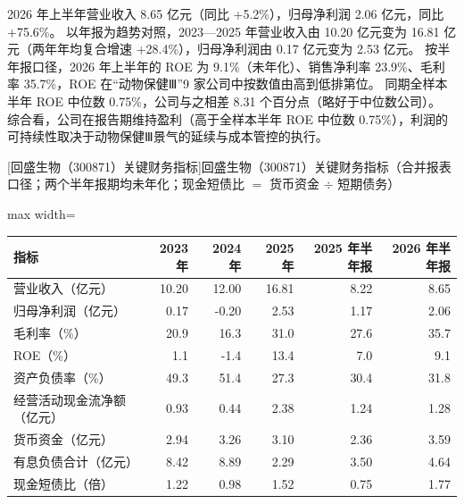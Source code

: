  2026 年上半年营业收入 8.65 亿元（同比 +5.2\%），归母净利润 2.06 亿元，同比 +75.6\%。 以年报为趋势对照，2023---2025 年营业收入由 10.20 亿元变为 16.81 亿元（两年年均复合增速 +28.4\%），归母净利润由 0.17 亿元变为 2.53 亿元。 按半年报口径，2026 年上半年的 ROE 为 9.1\%（未年化）、销售净利率 23.9\%、毛利率 35.7\%，ROE 在“动物保健Ⅲ”9 家公司中按数值由高到低排第位。 同期全样本半年 ROE 中位数 0.75\%，公司与之相差 8.31 个百分点（略好于中位数公司）。 综合看，公司在报告期维持盈利（高于全样本半年 ROE 中位数 0.75\%），利润的可持续性取决于动物保健Ⅲ景气的延续与成本管控的执行。

\begin{center}\small\setlength{\tabcolsep}{3.4pt}
[回盛生物（300871）关键财务指标]{回盛生物（300871）关键财务指标（合并报表口径；两个半年报期均未年化；现金短债比 $=$ 货币资金 $\div$ 短期债务）}
\begin{adjustbox}{max width=\textwidth}
\begin{tabular}{@{}lrrrrr@{}}
\toprule
指标 & 2023 年 & 2024 年 & 2025 年 & 2025 年半年报 & 2026 年半年报 \\
\midrule
营业收入（亿元） & 10.20 & 12.00 & 16.81 & 8.22 & 8.65 \\
归母净利润（亿元） & 0.17 & -0.20 & 2.53 & 1.17 & 2.06 \\
毛利率（\%） & 20.9 & 16.3 & 31.0 & 27.6 & 35.7 \\
ROE（\%） & 1.1 & -1.4 & 13.4 & 7.0 & 9.1 \\
资产负债率（\%） & 49.3 & 51.4 & 27.3 & 30.4 & 31.8 \\
经营活动现金流净额（亿元） & 0.93 & 0.44 & 2.38 & 1.24 & 1.28 \\
货币资金（亿元） & 2.94 & 3.26 & 3.10 & 2.36 & 3.59 \\
有息负债合计（亿元） & 8.42 & 8.89 & 2.29 & 3.50 & 4.64 \\
现金短债比（倍） & 1.22 & 0.98 & 1.52 & 0.75 & 1.77 \\
\bottomrule
\end{tabular}
\end{adjustbox}
\end{center}


